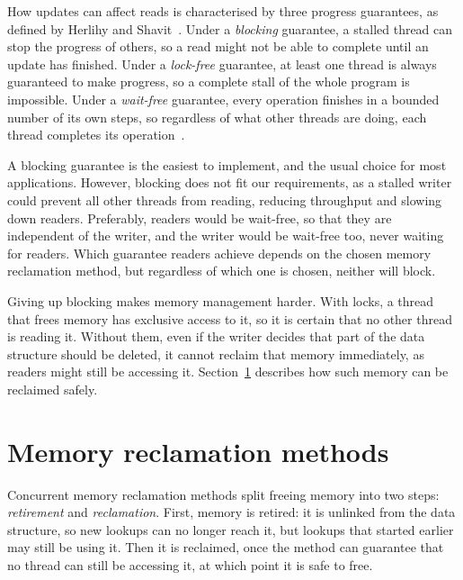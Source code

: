 \documentclass[11pt,a4paper,oneside]{report}
\begin{document}
How updates can affect reads is characterised by three progress guarantees, as
defined by Herlihy and Shavit~\cite{herlihy2008art}. Under a \emph{blocking}
guarantee, a stalled thread can stop the progress of others, so a read might not
be able to complete until an update has finished. Under a \emph{lock-free}
guarantee, at least one thread is always guaranteed to make progress, so a
complete stall of the whole program is impossible. Under a \emph{wait-free}
guarantee, every operation finishes in a bounded number of its own steps, so
regardless of what other threads are doing, each thread completes its
operation~\cite{herlihy1991}.

A blocking guarantee is the easiest to implement, and the usual choice for most
applications. However, blocking does not fit our requirements, as a stalled
writer could prevent all other threads from reading, reducing throughput and
slowing down readers. Preferably, readers would be wait-free, so that they are
independent of the writer, and the writer would be wait-free too, never waiting
for readers. Which guarantee readers achieve depends on the chosen memory
reclamation method, but regardless of which one is chosen, neither will block.

Giving up blocking makes memory management harder. With locks, a thread that
frees memory has exclusive access to it, so it is certain that no other thread
is reading it. Without them, even if the writer decides that part of the data
structure should be deleted, it cannot reclaim that memory immediately, as
readers might still be accessing it. Section~\ref{sec:reclamation} describes how
such memory can be reclaimed safely.

\section{Memory reclamation methods}
\label{sec:reclamation}

Concurrent memory reclamation methods split freeing memory into two steps:
\emph{retirement} and \emph{reclamation}. First, memory is retired: it is
unlinked from the data structure, so new lookups can no longer reach it, but
lookups that started earlier may still be using it. Then it is reclaimed, once
the method can guarantee that no thread can still be accessing it, at which
point it is safe to free.
\end{document}
